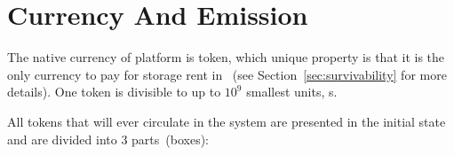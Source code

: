 \section{Currency And Emission}
\label{sec:currency}


The native currency of \Ergo{} platform is \Erg{} token, which unique property is
that it is the only currency to pay for storage rent in \Ergo{}~(see Section~\ref{sec:survivability} for more details).
One \Erg{} token is divisible to up to $10^9$ smallest units, \nanoErg{}s.

All \Erg{} tokens that will ever circulate in the system are presented in
the initial state and are divided into 3 parts~(boxes):


